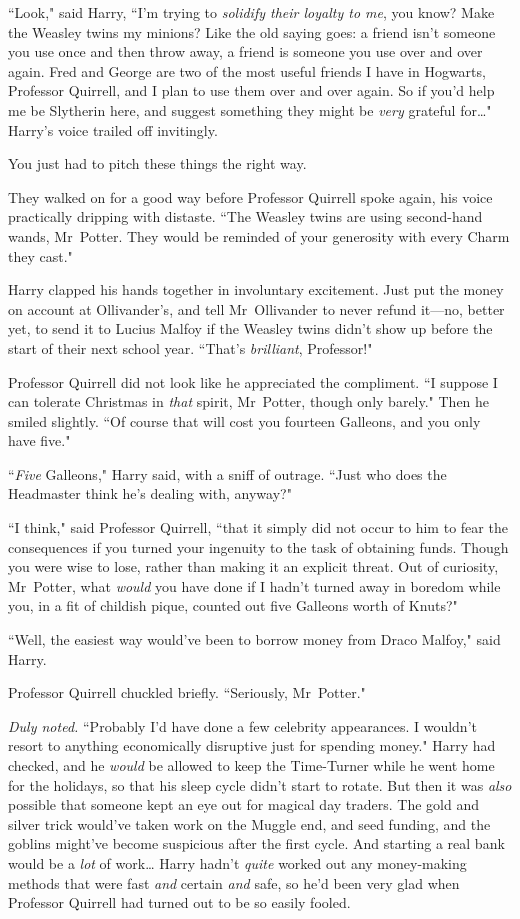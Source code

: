 ``Look," said Harry, ``I'm trying to \emph{solidify their loyalty to me}, you know? Make the Weasley twins my minions? Like the old saying goes: a friend isn't someone you use once and then throw away, a friend is someone you use over and over again. Fred and George are two of the most useful friends I have in Hogwarts, Professor Quirrell, and I plan to use them over and over again. So if you'd help me be Slytherin here, and suggest something they might be \emph{very} grateful for{\ldots}" Harry's voice trailed off invitingly.

You just had to pitch these things the right way.

They walked on for a good way before Professor Quirrell spoke again, his voice practically dripping with distaste. ``The Weasley twins are using second-hand wands, Mr~Potter. They would be reminded of your generosity with every Charm they cast."

Harry clapped his hands together in involuntary excitement. Just put the money on account at Ollivander's, and tell Mr~Ollivander to never refund it—no, better yet, to send it to Lucius Malfoy if the Weasley twins didn't show up before the start of their next school year. ``That's \emph{brilliant}, Professor!"

Professor Quirrell did not look like he appreciated the compliment. ``I suppose I can tolerate Christmas in \emph{that} spirit, Mr~Potter, though only barely." Then he smiled slightly. ``Of course that will cost you fourteen Galleons, and you only have five."

``\emph{Five} Galleons," Harry said, with a sniff of outrage. ``Just who does the Headmaster think he's dealing with, anyway?"

``I think," said Professor Quirrell, ``that it simply did not occur to him to fear the consequences if you turned your ingenuity to the task of obtaining funds. Though you were wise to lose, rather than making it an explicit threat. Out of curiosity, Mr~Potter, what \emph{would} you have done if I hadn't turned away in boredom while you, in a fit of childish pique, counted out five Galleons worth of Knuts?"

``Well, the easiest way would've been to borrow money from Draco Malfoy," said Harry.

Professor Quirrell chuckled briefly. ``Seriously, Mr~Potter."

\emph{Duly noted.} ``Probably I'd have done a few celebrity appearances. I wouldn't resort to anything economically disruptive just for spending money." Harry had checked, and he \emph{would} be allowed to keep the Time-Turner while he went home for the holidays, so that his sleep cycle didn't start to rotate. But then it was \emph{also} possible that someone kept an eye out for magical day traders. The gold and silver trick would've taken work on the Muggle end, and seed funding, and the goblins might've become suspicious after the first cycle. And starting a real bank would be a \emph{lot} of work{\ldots} Harry hadn't \emph{quite} worked out any money-making methods that were fast \emph{and} certain \emph{and} safe, so he'd been very glad when Professor Quirrell had turned out to be so easily fooled.

